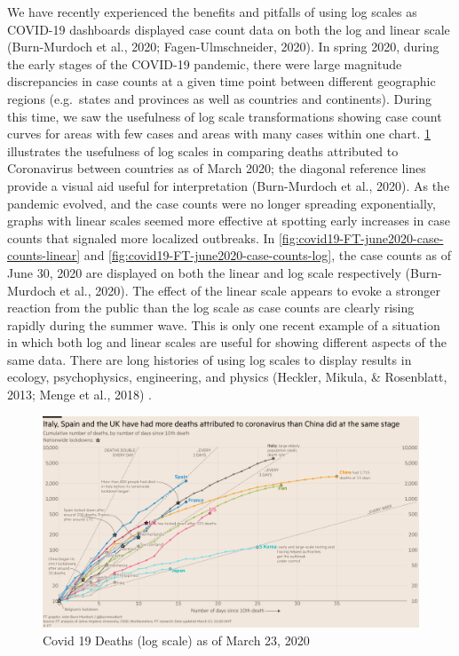 \documentclass[print]{nuthesis}
\begin{document}
We have recently experienced the benefits and pitfalls of using log scales as COVID-19 dashboards displayed
case count data on both the log and linear scale (Burn-Murdoch et al., 2020; Fagen-Ulmschneider, 2020).
In spring 2020, during the early stages of the COVID-19 pandemic, there were large magnitude discrepancies in case counts at a given time point between different geographic regions (e.g.~states and provinces as well as countries and continents).
During this time, we saw the usefulness of log scale transformations showing case count curves for areas with few cases and areas with many cases within one chart.
\cref{fig:covid19-FT-deaths-march2020-log} illustrates the usefulness of log scales in comparing deaths attributed to Coronavirus between countries as of March 2020; the diagonal reference lines provide a visual aid useful for interpretation (Burn-Murdoch et al., 2020).
As the pandemic evolved, and the case counts were no longer spreading exponentially, graphs with linear scales seemed more effective at spotting early increases in case counts that signaled more localized outbreaks. In \cref{fig:covid19-FT-june2020-case-counts-linear} and \cref{fig:covid19-FT-june2020-case-counts-log}, the case counts as of June 30, 2020 are displayed on both the linear and log scale respectively (Burn-Murdoch et al., 2020).
The effect of the linear scale  appears to evoke a stronger reaction from the public than the log scale  as case counts are clearly rising rapidly during the summer wave.
This is only one recent example of a situation in which both log and linear scales are useful for showing different aspects of the same data. There are long histories of using log scales to display results in ecology, psychophysics, engineering, and physics (Heckler, Mikula, \& Rosenblatt, 2013; Menge et al., 2018)
.

\begin{figure}[tbp]

{\centering \includegraphics[width=0.9\linewidth,]{images/covid19-FT-03.23.2020-log} 

}

\caption{Covid 19 Deaths (log scale) as of March 23, 2020}\label{fig:covid19-FT-deaths-march2020-log}
\end{figure}
\end{document}
